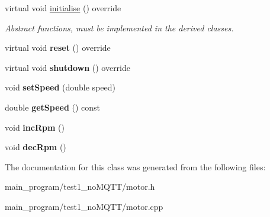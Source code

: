 \begin{DoxyCompactItemize}
\item 
virtual void \hyperlink{class_motor_af499f6ed70a5f8a7f57b08c08b0c381f}{initialise} () override\hypertarget{class_motor_af499f6ed70a5f8a7f57b08c08b0c381f}{}\label{class_motor_af499f6ed70a5f8a7f57b08c08b0c381f}

\begin{DoxyCompactList}\small\item\em Abstract functions, must be implemented in the derived classes. \end{DoxyCompactList}\item 
virtual void {\bfseries reset} () override\hypertarget{class_motor_a8118086ae56a38eca05df9a149bf22a6}{}\label{class_motor_a8118086ae56a38eca05df9a149bf22a6}

\item 
virtual void {\bfseries shutdown} () override\hypertarget{class_motor_a2fb3663647ed56cc9061ab1a914df95a}{}\label{class_motor_a2fb3663647ed56cc9061ab1a914df95a}

\item 
void {\bfseries set\+Speed} (double speed)\hypertarget{class_motor_a4aece812dc94b008a874e4b38c3a3863}{}\label{class_motor_a4aece812dc94b008a874e4b38c3a3863}

\item 
double {\bfseries get\+Speed} () const \hypertarget{class_motor_aa6ed19d9c4f2deb0bb38460e3572bdc4}{}\label{class_motor_aa6ed19d9c4f2deb0bb38460e3572bdc4}

\item 
void {\bfseries inc\+Rpm} ()\hypertarget{class_motor_a93a4de89dd6f493c165137a78e3d97b4}{}\label{class_motor_a93a4de89dd6f493c165137a78e3d97b4}

\item 
void {\bfseries dec\+Rpm} ()\hypertarget{class_motor_ac271f30175d294a9d27d50193840d61e}{}\label{class_motor_ac271f30175d294a9d27d50193840d61e}

\end{DoxyCompactItemize}


The documentation for this class was generated from the following files\+:\begin{DoxyCompactItemize}
\item 
main\+\_\+program/test1\+\_\+no\+M\+Q\+T\+T/motor.\+h\item 
main\+\_\+program/test1\+\_\+no\+M\+Q\+T\+T/motor.\+cpp\end{DoxyCompactItemize}
